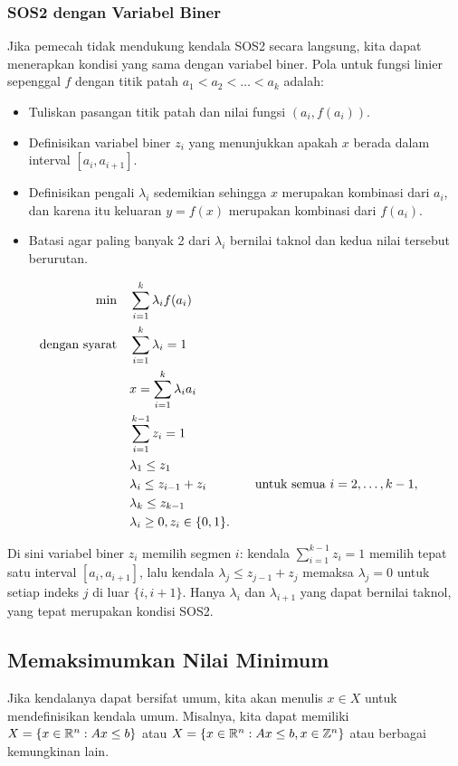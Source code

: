 \subsubsection{SOS2 dengan Variabel Biner}

Jika pemecah tidak mendukung kendala SOS2 secara langsung, kita dapat menerapkan kondisi yang sama dengan variabel biner. Pola untuk fungsi linier sepenggal $f$ dengan titik patah $a_1 < a_2 < \dots < a_k$ adalah:
\begin{itemize}
\item Tuliskan pasangan titik patah dan nilai fungsi $(a_i, f(a_i))$.
\item Definisikan variabel biner $z_i$ yang menunjukkan apakah $x$ berada dalam interval $[a_i, a_{i+1}]$.
\item Definisikan pengali $\lambda_i$ sedemikian sehingga $x$ merupakan kombinasi dari $a_i$, dan karena itu keluaran $y = f(x)$ merupakan kombinasi dari $f(a_i)$.
\item Batasi agar paling banyak 2 dari $\lambda_i$ bernilai taknol dan kedua nilai tersebut berurutan.

\end{itemize}

\begin{align*}
\min \quad & \sum_{i=1}^k \lambda_i f(a_i) \\
\mbox{dengan syarat}\quad        & \sum_{i=1}^k \lambda_i = 1 \\
& x = \sum_{i=1}^k \lambda_i a_i \\
& \sum_{i=1}^{k-1} z_i = 1 \\
& \lambda_1 \leq z_1 \\
& \lambda_i \leq z_{i-1} + z_{i} &&\quad \mbox{untuk semua } i=2, \dots, k-1, \\
& \lambda_k \leq z_{k-1} \\
& \lambda_i \geq 0, z_i \in \{0,1\}.
\end{align*}

Di sini variabel biner $z_i$ memilih segmen $i$: kendala $\sum_{i=1}^{k-1} z_i = 1$ memilih tepat satu interval $[a_i, a_{i+1}]$, lalu kendala $\lambda_j \leq z_{j-1} + z_j$ memaksa $\lambda_j = 0$ untuk setiap indeks $j$ di luar $\{i, i+1\}$. Hanya $\lambda_i$ dan $\lambda_{i+1}$ yang dapat bernilai taknol, yang tepat merupakan kondisi SOS2.

\subsection{Memaksimumkan Nilai Minimum}
Jika kendalanya dapat bersifat umum, kita akan menulis $x \in X$ untuk mendefinisikan kendala umum. Misalnya, kita dapat memiliki $X = \{ x \in {\mathbb{R}}^n : Ax \leq b\}$ atau $X  = \{ x \in {\mathbb{R}}^n : Ax \leq b, x \in {\mathbb{Z}}^n\}$ atau berbagai kemungkinan lain.


